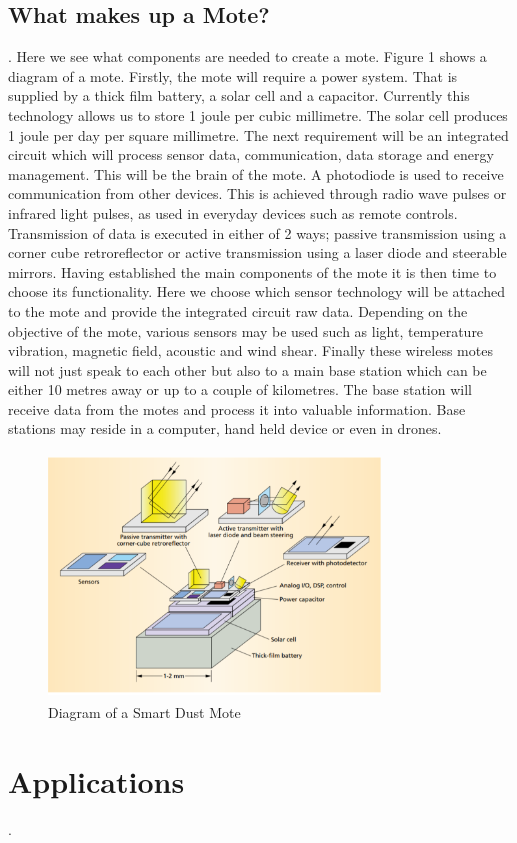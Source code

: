 \documentclass[article]{IEEEtran}
\begin{document}
\subsection*{What makes up a Mote?}.\newline
Here we see what components are needed to create a mote. 
Figure 1 shows a diagram of a mote. Firstly, the mote will require a power system. That is supplied by a thick film battery, a solar cell and a capacitor. Currently this technology allows us to store 1 joule per cubic millimetre. The solar cell produces 1 joule per day per square millimetre. 
The next requirement will be an integrated circuit which will process sensor data, communication, data storage and energy management. This will be the brain of the mote. 
A photodiode is used to receive communication from other devices. This is achieved through radio wave pulses or infrared light pulses, as used in everyday devices such as remote controls. 
Transmission of data is executed in either of 2 ways; passive transmission using a corner cube retroreflector or active transmission using a laser diode and steerable mirrors.
Having established the main components of the mote it is then time to choose its functionality. Here we choose which sensor technology will be attached to the mote and provide the integrated circuit raw data. Depending on the objective of the mote, various sensors may be used such as light, temperature vibration, magnetic field, acoustic and wind shear.
Finally these wireless motes will not just speak to each other but also to a main base station which can be either 10 metres away or up to a couple of kilometres.  The base station will receive data from the motes and process it into valuable information. Base stations may reside in a computer, hand held device or even in drones\cite{Mili}.

\begin{figure}[h!]
\graphicspath{ {images/} }
\includegraphics[width=8.8cm, height=6.5cm]{figure1}
\caption{Diagram of a Smart Dust Mote}
\label{Mote Diagram}
\end{figure}


\section{Applications}.\newline

\listoffigures
\printbibliography
\end{document}
